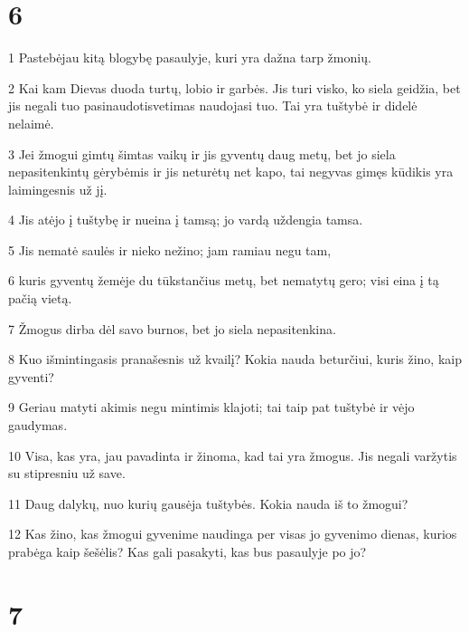 \chapter{6}


\par 1 Pastebėjau kitą blogybę pasaulyje, kuri yra dažna tarp žmonių. 
\par 2 Kai kam Dievas duoda turtų, lobio ir garbės. Jis turi visko, ko siela geidžia, bet jis negali tuo pasinaudoti­svetimas naudojasi tuo. Tai yra tuštybė ir didelė nelaimė. 
\par 3 Jei žmogui gimtų šimtas vaikų ir jis gyventų daug metų, bet jo siela nepasitenkintų gėrybėmis ir jis neturėtų net kapo, tai negyvas gimęs kūdikis yra laimingesnis už jį. 
\par 4 Jis atėjo į tuštybę ir nueina į tamsą; jo vardą uždengia tamsa. 
\par 5 Jis nematė saulės ir nieko nežino; jam ramiau negu tam, 
\par 6 kuris gyventų žemėje du tūkstančius metų, bet nematytų gero; visi eina į tą pačią vietą. 
\par 7 Žmogus dirba dėl savo burnos, bet jo siela nepasitenkina. 
\par 8 Kuo išmintingasis pranašesnis už kvailį? Kokia nauda beturčiui, kuris žino, kaip gyventi? 
\par 9 Geriau matyti akimis negu mintimis klajoti; tai taip pat tuštybė ir vėjo gaudymas. 
\par 10 Visa, kas yra, jau pavadinta ir žinoma, kad tai yra žmogus. Jis negali varžytis su stipresniu už save. 
\par 11 Daug dalykų, nuo kurių gausėja tuštybės. Kokia nauda iš to žmogui? 
\par 12 Kas žino, kas žmogui gyvenime naudinga per visas jo gyvenimo dienas, kurios prabėga kaip šešėlis? Kas gali pasakyti, kas bus pasaulyje po jo?



\chapter{7}


